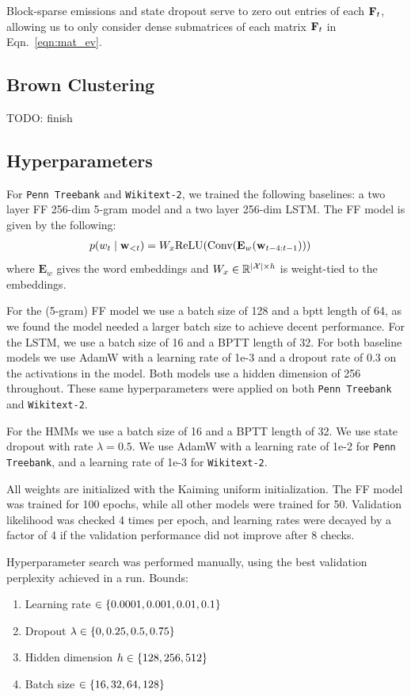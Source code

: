 \documentclass[11pt,a4paper]{article}
\begin{document}
Block-sparse emissions and state dropout serve to zero out entries of each $\mathbf{F}_t$,
allowing us to only consider dense submatrices of each matrix $\mathbf{F}_t$ in Eqn.~\ref{eqn:mat_ev}.

\subsection{Brown Clustering}
TODO: finish

\subsection{Hyperparameters}
\label{sec:hyperparams}

For \texttt{Penn Treebank} and \texttt{Wikitext-2}, we trained the following baselines:
a two layer FF 256-dim 5-gram model and a two layer 256-dim LSTM.
The FF model is given by the following:
\begin{equation}
\begin{aligned}
p(w_t \mid \mathbf{w}_{<t})
&= W_x\textrm{ReLU}(\textrm{Conv}(\mathbf{E}_w(\mathbf{w}_{t-4:t-1})))
\end{aligned}
\end{equation}
where $\mathbf{E}_w$ gives the word embeddings and
$W_x\in\mathbb{R}^{|\mathcal{X}|\times h}$ is weight-tied to the embeddings.

For the (5-gram) FF model we use a batch size of 128 and a bptt length of 64,
as we found the model needed a larger batch size to achieve decent performance.
For the LSTM, we use a batch size of 16 and a BPTT length of 32.
For both baseline models we use AdamW \citep{adamw} with a learning rate of 1e-3 and a dropout rate of 0.3 on the activations in the model.
Both models use a hidden dimension of 256 throughout.
These same hyperparameters were applied on both \texttt{Penn Treebank} and \texttt{Wikitext-2}.

For the HMMs we use a batch size of 16 and a BPTT length of 32.
We use state dropout with rate $\lambda = 0.5$.
We use AdamW \citep{adamw} with a learning rate of 1e-2 for \texttt{Penn Treebank},
and a learning rate of 1e-3 for \texttt{Wikitext-2}.

All weights are initialized with the Kaiming uniform initialization.
The FF model was trained for 100 epochs, while all other models were trained for 50.
Validation likelihood was checked 4 times per epoch, and
learning rates were decayed by a factor of 4 if the validation performance
did not improve after 8 checks.

Hyperparameter search was performed manually, using the best
validation perplexity achieved in a run.
Bounds:
\begin{enumerate}
\item Learning rate $\in \left\{0.0001, 0.001, 0.01, 0.1\right\}$
\item Dropout $\lambda \in \left\{0, 0.25, 0.5, 0.75\right\}$
\item Hidden dimension $h \in \left\{128,256,512\right\}$
\item Batch size $\in \left\{16, 32, 64, 128\right\}$
\end{enumerate}
\end{document}

